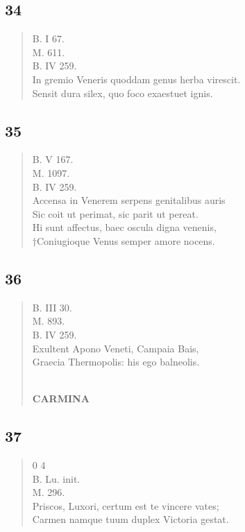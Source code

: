 \documentclass[11pt, a4paper]{report}
\begin{document}
            \subsection*{34}
      \begin{verse}
      B. I 67. \\ M. 611. \\ B. IV 259. \\ In gremio Veneris quoddam genus herba virescit. \\ Sensit dura silex, quo foco exaestuet ignis. \\ 
      \end{verse}
  
            \subsection*{35}
      \begin{verse}
      B. V 167. \\ M. 1097. \\ B. IV 259. \\ Accensa in Venerem serpens genitalibus auris \\ Sic coit ut perimat, sic parit ut pereat. \\ Hi sunt affectus, baec oscula digna venenis, \\ †Coniugioque Venus semper amore nocens. \\ 
      \end{verse}
  
            \subsection*{36}
      \begin{verse}
      B. III 30. \\ M. 893. \\ B. IV 259. \\ Exultent Apono Veneti, Campaia Bais, \\ Graecia Thermopolis: his ego balneolis. \\ 
        ﻿\pagebreak 
     \marginpar{[102]} \begin{center} \textbf{CARMINA} \end{center}
      \end{verse}
  
            \subsection*{37}
      \begin{verse}
      0 4 \\ B. Lu. init. \\ M. 296. \\ Priscos, Luxori, certum est te vincere vates; \\ Carmen namque tuum duplex Victoria gestat. \\ 
      \end{verse}
  
\end{document}
